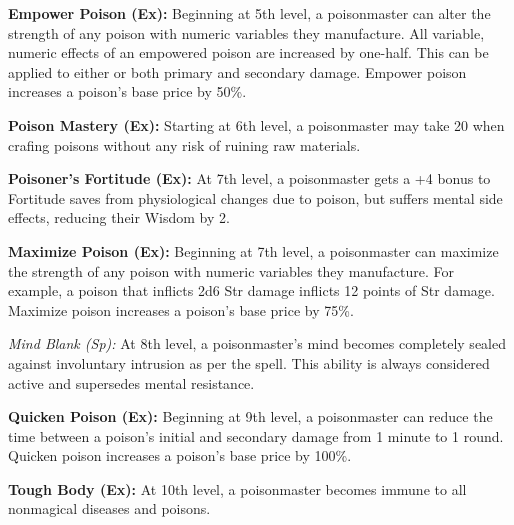 {\textbf{Empower Poison (Ex):} Beginning at 5th level, a poisonmaster can alter the strength of any poison with numeric variables they manufacture. All variable, numeric effects of an empowered poison are increased by one-half. This can be applied to either or both primary and secondary damage. Empower poison increases a poison's base price by 50\%.


\textbf{Poison Mastery (Ex):} Starting at 6th level, a poisonmaster may take 20 when crafing poisons without any risk of ruining raw materials.


\textbf{Poisoner's Fortitude (Ex):} At 7th level, a poisonmaster gets a +4 bonus to Fortitude saves from physiological changes due to poison, but suffers mental side effects, reducing their Wisdom by 2.


\textbf{Maximize Poison (Ex):} Beginning at 7th level, a poisonmaster can maximize the strength of any poison with numeric variables they manufacture. For example, a poison that inflicts 2d6 Str damage inflicts 12 points of Str damage. Maximize poison increases a poison's base price by 75\%.


\textit{Mind Blank (Sp):} At 8th level, a poisonmaster's mind becomes completely sealed against involuntary intrusion as per the  spell. This ability is always considered active and supersedes mental resistance.


\textbf{Quicken Poison (Ex):} Beginning at 9th level, a poisonmaster can reduce the time between a poison's initial and secondary damage from 1 minute to 1 round. Quicken poison increases a poison's base price by 100\%.


\textbf{Tough Body (Ex):} At 10th level, a poisonmaster becomes immune to all nonmagical diseases and poisons.
}
